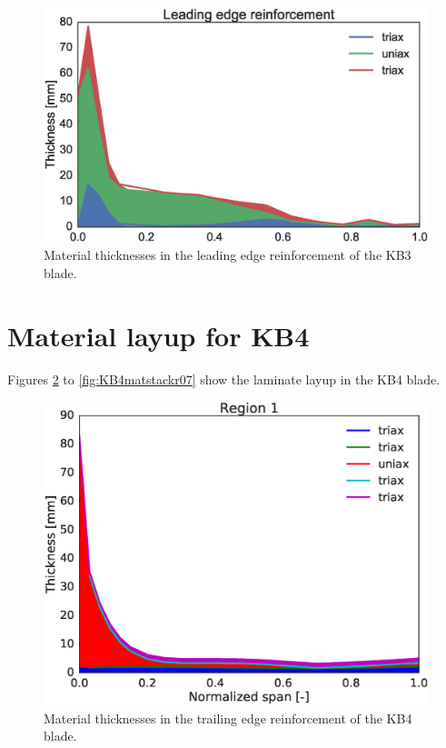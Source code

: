 \begin{figure}[pth]
\begin{center}
	\includegraphics[width=.85\linewidth]{figures/KB3_region07.eps}
\end{center}
\caption{Material thicknesses in the leading edge reinforcement of the KB3 blade.}
\label{fig:KB3matstackr07}
\end{figure}
\section{Material layup for KB4}
Figures \ref{fig:KB4matstackr01} to \ref{fig:KB4matstackr07} show the laminate layup in the KB4 blade.

\begin{figure}[pth]
\begin{center}
	\includegraphics[width=.85\linewidth]{figures/KB4_laminate_layers_r01.eps}
\end{center}
\caption{Material thicknesses in the trailing edge reinforcement of the KB4 blade.}
\label{fig:KB4matstackr01}
\end{figure}


